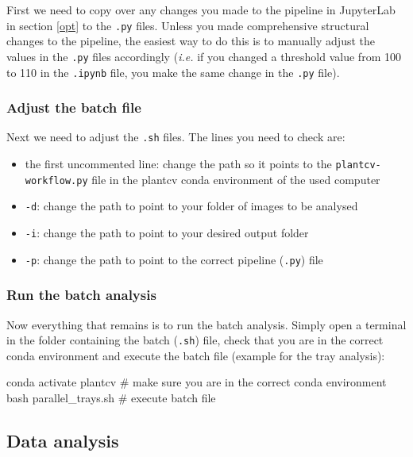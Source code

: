 \documentclass[10pt]{article}
\begin{document}
First we need to copy over any changes you made to the pipeline in JupyterLab in section \ref{opt} to the \texttt{.py} files. Unless you made comprehensive structural changes to the pipeline, the easiest way to do this is to manually adjust the values in the \texttt{.py} files accordingly (\textit{i.e.} if you changed a threshold value from 100 to 110 in the \texttt{.ipynb} file, you make the same change in the \texttt{.py} file).

\subsubsection{Adjust the batch file}

Next we need to adjust the \texttt{.sh} files. The lines you need to check are:

\begin{itemize}
	\item the first uncommented line: change the path so it points to the \texttt{plantcv-workflow.py} file in the plantcv conda environment of the used computer
	\item \texttt{-d}: change the path to point to your folder of images to be analysed 
	\item \texttt{-i}: change the path to point to your desired output folder
	\item \texttt{-p}: change the path to point to the correct pipeline (\texttt{.py}) file
\end{itemize}

\subsubsection{Run the batch analysis}

Now everything that remains is to run the batch analysis. Simply open a terminal in the folder containing the batch (\texttt{.sh}) file, check that you are in the correct conda environment and execute the batch file (example for the tray analysis):

\begin{bashcode}
	conda activate plantcv # make sure you are in the correct conda environment
	bash parallel_trays.sh # execute batch file
\end{bashcode}

\subsection{Data analysis}
\end{document}
